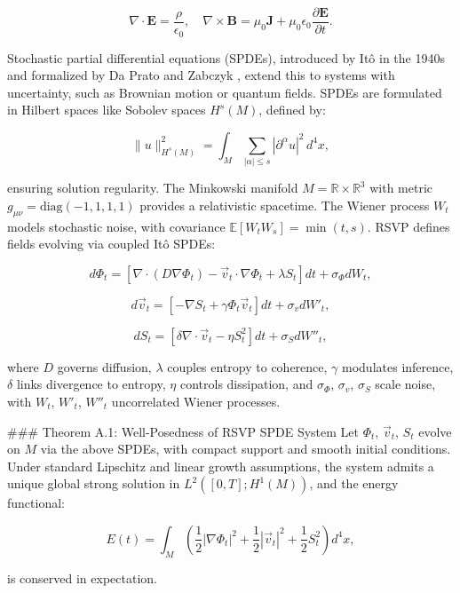 \documentclass[12pt]{article}
\begin{document}
\[
\nabla \cdot \mathbf{E} = \frac{\rho}{\epsilon_0}, \quad \nabla \times \mathbf{B} = \mu_0 \mathbf{J} + \mu_0 \epsilon_0 \frac{\partial \mathbf{E}}{\partial t}.
\]

Stochastic partial differential equations (SPDEs), introduced by Itô in the 1940s and formalized by Da Prato and Zabczyk \cite{daprato2014stochastic}, extend this to systems with uncertainty, such as Brownian motion or quantum fields. SPDEs are formulated in Hilbert spaces like Sobolev spaces $H^s(M)$, defined by:

\[
\|u\|_{H^s(M)}^2 = \int_M \sum_{|\alpha| \leq s} |\partial^\alpha u|^2 \, d^4x,
\]

ensuring solution regularity. The Minkowski manifold $M = \mathbb{R} \times \mathbb{R}^3$ with metric $g_{\mu\nu} = \text{diag}(-1, 1, 1, 1)$ provides a relativistic spacetime. The Wiener process $W_t$ models stochastic noise, with covariance $\mathbb{E}[W_t W_s] = \min(t,s)$. RSVP defines fields evolving via coupled Itô SPDEs:

\[
d\Phi_t = \left[ \nabla \cdot (D \nabla \Phi_t) - \vec{v}_t \cdot \nabla \Phi_t + \lambda S_t \right] dt + \sigma_\Phi dW_t,
\]

\[
d\vec{v}_t = \left[ -\nabla S_t + \gamma \Phi_t \vec{v}_t \right] dt + \sigma_v dW'_t,
\]

\[
dS_t = \left[ \delta \nabla \cdot \vec{v}_t - \eta S_t^2 \right] dt + \sigma_S dW''_t,
\]

where $D$ governs diffusion, $\lambda$ couples entropy to coherence, $\gamma$ modulates inference, $\delta$ links divergence to entropy, $\eta$ controls dissipation, and $\sigma_\Phi$, $\sigma_v$, $\sigma_S$ scale noise, with $W_t$, $W'_t$, $W''_t$ uncorrelated Wiener processes.

### Theorem A.1: Well-Posedness of RSVP SPDE System
Let $\Phi_t$, $\vec{v}_t$, $S_t$ evolve on $M$ via the above SPDEs, with compact support and smooth initial conditions. Under standard Lipschitz and linear growth assumptions, the system admits a unique global strong solution in $L^2([0,T]; H^1(M))$, and the energy functional:

\[
E(t) = \int_M \left( \frac{1}{2} |\nabla \Phi_t|^2 + \frac{1}{2} |\vec{v}_t|^2 + \frac{1}{2} S_t^2 \right) d^4x,
\]

is conserved in expectation.
\end{document}
